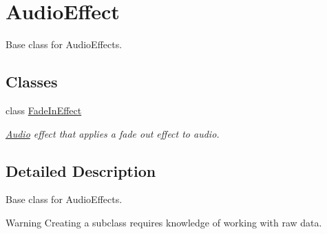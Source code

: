\hypertarget{group___audio_effect}{}\section{Audio\+Effect}
\label{group___audio_effect}


Base class for Audio\+Effects.  


\subsection*{Classes}
\begin{DoxyCompactItemize}
\item 
class \hyperlink{class_fade_in_effect}{Fade\+In\+Effect}
\begin{DoxyCompactList}\small\item\em \hyperlink{class_audio}{Audio} effect that applies a fade out effect to audio. \end{DoxyCompactList}\end{DoxyCompactItemize}


\subsection{Detailed Description}
Base class for Audio\+Effects. 

\begin{DoxyWarning}{Warning}
Creating a subclass requires knowledge of working with raw data. 
\end{DoxyWarning}
